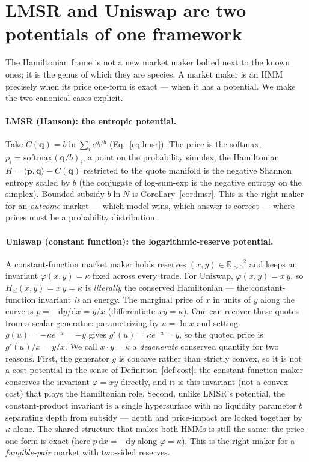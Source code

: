 \documentclass[11pt]{article}
\newcommand{\Rpos}{\ensuremath{\mathbb{R}_{>0}}}
\newcommand{\dd}{\mathrm{d}}
\newcommand{\inner}[2]{\ensuremath{\langle #1, #2\rangle}}
\begin{document}
\section{LMSR and Uniswap are two potentials of one framework}
\label{sec:hmm-unify}

The Hamiltonian frame is not a new market maker bolted next to the known ones; it
is the genus of which they are species. A market maker is an HMM precisely when its
price one-form is exact --- when it has a potential. We make the two canonical cases
explicit.

\paragraph{LMSR (Hanson): the entropic potential.} Take
$C(\bm q)=b\ln\sum_i e^{q_i/b}$ (Eq.~\eqref{eq:lmsr}). The price is the softmax,
$p_i = \mathrm{softmax}(\bm q/b)_i$, a point on the probability simplex; the
Hamiltonian $H=\inner{\bm p}{\bm q}-C(\bm q)$ restricted to the quote manifold is
the negative Shannon entropy scaled by $b$ (the conjugate of log-sum-exp is the
negative entropy on the simplex). Bounded subsidy $b\ln N$ is
Corollary~\ref{cor:lmsr}. This is the right maker for an \emph{outcome} market ---
which model wins, which answer is correct --- where prices must be a probability
distribution.

\paragraph{Uniswap (constant function): the logarithmic-reserve potential.} A
constant-function market maker holds reserves $(x,y)\in\Rpos^2$ and keeps an
invariant $\varphi(x,y)=\kappa$ fixed across every trade. For Uniswap,
$\varphi(x,y)=x\,y$, so $H_{\mathrm{cf}}(x,y) = x\,y = \kappa$ is \emph{literally}
the conserved Hamiltonian --- the constant-function invariant \emph{is} an energy.
The marginal price of $x$ in units of $y$ along the curve is
$p = -\dd y/\dd x = y/x$ (differentiate $xy=\kappa$). One can recover these quotes
from a scalar generator: parametrizing by $u=\ln x$ and setting
$g(u) = -\kappa e^{-u} = -y$ gives $g'(u)=\kappa e^{-u}=y$, so the quoted price is
$g'(u)/x = y/x$. We call $x\cdot y=k$ a \emph{degenerate} conserved quantity for two
reasons. First, the generator $g$ is concave rather than strictly convex, so it is
not a cost potential in the sense of Definition~\ref{def:cost}; the
constant-function maker conserves the invariant $\varphi=xy$ directly, and it is
this invariant (not a convex cost) that plays the Hamiltonian role. Second, unlike
LMSR's potential, the constant-product invariant is a single hypersurface with no
liquidity parameter $b$ separating depth from subsidy --- depth and price-impact are
locked together by $\kappa$ alone. The shared structure that makes both HMMs is
still the same: the price one-form is exact (here $p\,\dd x = -\dd y$ along
$\varphi=\kappa$). This is the right maker for a \emph{fungible-pair} market with
two-sided reserves.
\end{document}
